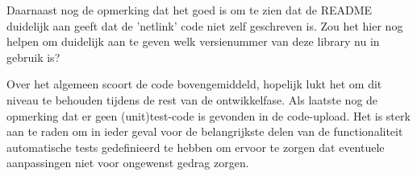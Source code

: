 	Daarnaast nog de opmerking dat het goed is om te zien dat de README duidelijk aan geeft dat de 'netlink' code niet zelf geschreven is. Zou het hier nog helpen om duidelijk aan te geven welk versienummer van deze library nu in gebruik is?

	Over het algemeen scoort de code bovengemiddeld, hopelijk lukt het om dit niveau te behouden tijdens de rest van de ontwikkelfase. Als laatste nog de opmerking dat er geen (unit)test-code is gevonden in de code-upload. Het is sterk aan te raden om in ieder geval voor de belangrijkste delen van de functionaliteit automatische tests gedefinieerd te hebben om ervoor te zorgen dat eventuele aanpassingen niet voor ongewenst gedrag zorgen. 
	
